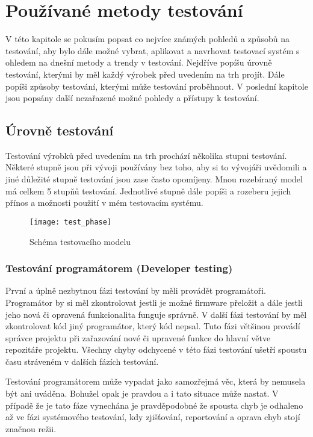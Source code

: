 \chapter{Používané metody testování}
V této kapitole se pokusím popsat co nejvíce známých pohledů a způsobů na testování, aby bylo dále možné vybrat, aplikovat a navrhovat testovací systém s ohledem na dnešní metody a trendy v testování. Nejdříve popíšu úrovně testování, kterými by měl každý výrobek před uvedením na trh projít. Dále popíši způsoby  testování, kterými může testování proběhnout. V poslední kapitole jsou popsány další nezařazené možné pohledy a přístupy k testování.

\section{Úrovně testování}
Testování výrobků před uvedením na trh prochází několika stupni testování. Některé stupně jsou při vývoji používány bez toho, aby si to vývojáři uvědomili a jiné důležité stupně testování jsou zase často opomíjeny. Mnou rozebíraný model má celkem 5 stupňů testování. Jednotlivé stupně dále popíši a rozeberu jejich přínos a možnosti použití v mém testovacím systému.

\begin{figure}[h]
  \centering
  \texttt{[image: test\_phase]}
  \caption{Schéma testovacího modelu}
  \label{fig:test_phase}
\end{figure}

\subsection{Testování programátorem (Developer testing)}
První a úplně nezbytnou fázi testování by měli provádět programátoři. Programátor by si měl zkontrolovat jestli je možné firmware přeložit a dále jestli jeho nová či opravená funkcionalita funguje správně. V další fázi testování by měl zkontrolovat kód jiný programátor, který kód nepsal. Tuto fázi většinou provádí správce projektu při zařazování nové či upravené funkce do hlavní větve repozitáře projektu. Všechny chyby odchycené v této fázi testování ušetří spoustu času stráveném v dalších fázích testování.

Testování programátorem může vypadat jako samozřejmá věc, která by nemusela být ani uváděna. Bohužel opak je pravdou a i tato situace může nastat. V případě že je tato fáze vynechána je pravděpodobné že spousta chyb je odhaleno až ve fázi systémového testování, kdy zjišťování, reportování a oprava chyb stojí značnou režii.

